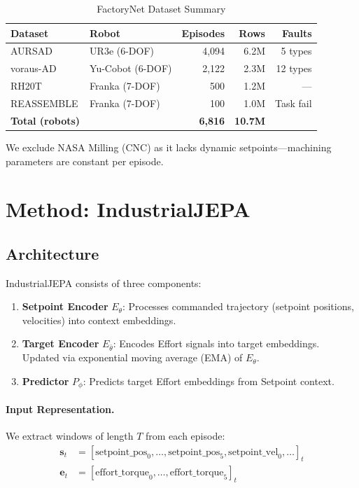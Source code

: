 \documentclass{article}
\begin{document}
\begin{table}[h]
\centering
\caption{FactoryNet Dataset Summary}
\begin{tabular}{llrrr}
\toprule
\textbf{Dataset} & \textbf{Robot} & \textbf{Episodes} & \textbf{Rows} & \textbf{Faults} \\
\midrule
AURSAD & UR3e (6-DOF) & 4,094 & 6.2M & 5 types \\
voraus-AD & Yu-Cobot (6-DOF) & 2,122 & 2.3M & 12 types \\
RH20T & Franka (7-DOF) & 500 & 1.2M & — \\
REASSEMBLE & Franka (7-DOF) & 100 & 1.0M & Task fail \\
\midrule
\textbf{Total (robots)} & & \textbf{6,816} & \textbf{10.7M} & \\
\bottomrule
\end{tabular}
\end{table}

We exclude NASA Milling (CNC) as it lacks dynamic setpoints—machining parameters are constant per episode.

\section{Method: IndustrialJEPA}

\subsection{Architecture}

IndustrialJEPA consists of three components:

\begin{enumerate}
    \item \textbf{Setpoint Encoder} $E_\theta$: Processes commanded trajectory (setpoint positions, velocities) into context embeddings.

    \item \textbf{Target Encoder} $E_{\bar{\theta}}$: Encodes Effort signals into target embeddings. Updated via exponential moving average (EMA) of $E_\theta$.

    \item \textbf{Predictor} $P_\phi$: Predicts target Effort embeddings from Setpoint context.
\end{enumerate}

\paragraph{Input Representation.} We extract windows of length $T$ from each episode:
\begin{align}
    \mathbf{s}_t &= [\text{setpoint\_pos}_0, \ldots, \text{setpoint\_pos}_5, \text{setpoint\_vel}_0, \ldots]_t \\
    \mathbf{e}_t &= [\text{effort\_torque}_0, \ldots, \text{effort\_torque}_5]_t
\end{align}
\end{document}
